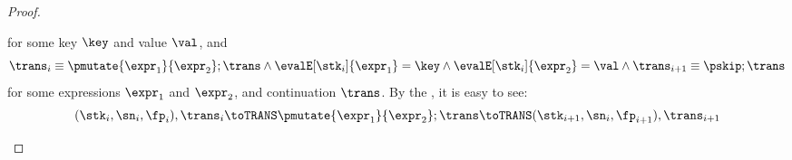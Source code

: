 \begin{proof}
\begin{itemize}
\begin{itemize}
\[                \]
                for some key \( \key \) and value \( \val \), and
                \[
                    \trans_{i} \equiv \pmutate{\expr_1}{\expr_2} ; \trans 
                    \land \evalE[\stk_i]{\expr_1} = \key 
                    \land \evalE[\stk_i]{\expr_2} = \val 
                    \land  \trans_{i+1} \equiv \pskip ; \trans
                \]
                for some expressions \( \expr_1 \) and \( \expr_2 \), and continuation \( \trans \).
                By the , it is easy to see: 
                \[
                    (\stk_i, \sn_i, \fp_i), \trans_i \toTRANS \pmutate{\expr_1}{\expr_2} ; \trans 
                    \toTRANS (\stk_{i+1}, \sn_i, \fp_{i+1} ), \trans_{i+1}
                \]
        \end{itemize}
    \end{itemize}
\end{proof}

